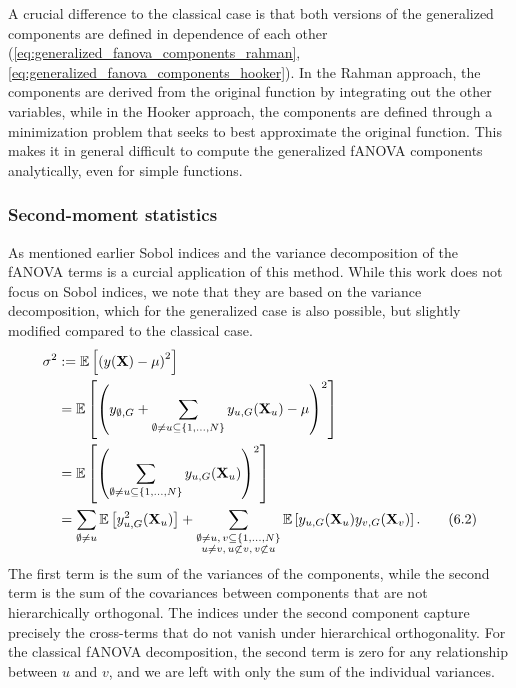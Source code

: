 A crucial difference to the classical case is that both versions of the generalized components are defined in dependence of each other (\autoref{eq:generalized_fanova_components_rahman}, \autoref{eq:generalized_fanova_components_hooker}).
In the Rahman approach, the components are derived from the original function by integrating out the other variables, while in the Hooker approach, the components are defined through a minimization problem that seeks to best approximate the original function.
This makes it in general difficult to compute the generalized fANOVA components analytically, even for simple functions.


\subsubsection*{Second-moment statistics}
As mentioned earlier Sobol indices and the variance decomposition of the fANOVA terms is a curcial application of this method.
While this work does not focus on Sobol indices, we note that they are based on the variance decomposition, which for the generalized case is also possible, but slightly modified compared to the classical case.
\begin{align}
\sigma^2 
&:= \mathbb{E}\left[ \left( y(\mathbf{X}) - \mu \right)^2 \right] \notag \\
&= \mathbb{E} \left[ \left( y_{\emptyset,G} + \sum_{\emptyset \ne u \subseteq \{1,\dots,N\}} y_{u,G}(\mathbf{X}_u) - \mu \right)^2 \right] \notag \\
&= \mathbb{E} \left[ \left( \sum_{\emptyset \ne u \subseteq \{1,\dots,N\}} y_{u,G}(\mathbf{X}_u) \right)^2 \right] \notag \\
&= \sum_{\emptyset \ne u} \mathbb{E} \left[ y_{u,G}^2(\mathbf{X}_u) \right]
+ \sum_{\substack{\emptyset \ne u,\,v \subseteq \{1,\dots,N\} \\ u \ne v,\, u \not\subset v,\, v \not\subset u}} 
\mathbb{E} \left[ y_{u,G}(\mathbf{X}_u) y_{v,G}(\mathbf{X}_v) \right].
\tag{6.2}
\end{align}
The first term is the sum of the variances of the components, while the second term is the sum of the covariances between components that are not hierarchically orthogonal. The indices under the second component capture precisely the cross-terms that do not vanish under hierarchical orthogonality. For the classical fANOVA decomposition, the second term is zero for any relationship between $u$ and $v$, and we are left with only the sum of the individual variances.



